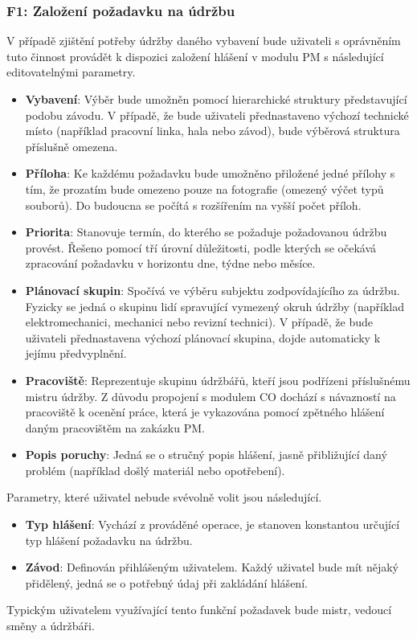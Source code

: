 \documentclass[thesis=M,czech]{FITthesis}[2012/06/26]
\begin{document}
\subsubsection{F1: Založení požadavku na údržbu}
V případě zjištění potřeby údržby daného vybavení bude uživateli s oprávněním tuto činnost provádět k dispozici založení hlášení v modulu PM s následující editovatelnými parametry.
\begin{itemize}
	\item
	\textbf{Vybavení}: Výběr bude umožněn pomocí hierarchické struktury představující podobu závodu. V případě, že bude uživateli přednastaveno výchozí technické místo (například pracovní linka, hala nebo závod), bude výběrová struktura příslušně omezena.  
	\item
	\textbf{Příloha}: Ke každému požadavku bude umožněno přiložené jedné přílohy s tím, že prozatím bude omezeno pouze na fotografie (omezený výčet typů souborů). Do budoucna se počítá s rozšířením na vyšší počet příloh.  
	\item
	\textbf{Priorita}: Stanovuje termín, do kterého se požaduje požadovanou údržbu provést. Řešeno pomocí tří úrovní důležitosti, podle kterých se očekává zpracování požadavku v horizontu dne, týdne nebo měsíce.
	\item
	\textbf{Plánovací skupin}: Spočívá ve výběru subjektu zodpovídajícího za údržbu. Fyzicky se jedná o skupinu lidí spravující vymezený okruh údržby (například elektromechanici, mechanici nebo revizní technici). V případě, že bude uživateli přednastavena výchozí plánovací skupina, dojde automaticky k jejímu předvyplnění.
	\item
	\textbf{Pracoviště}: Reprezentuje skupinu údržbářů, kteří jsou podřízeni příslušnému mistru údržby. Z důvodu propojení s modulem CO dochází s návazností na pracoviště k ocenění práce, která je vykazována pomocí zpětného hlášení daným pracovištěm na zakázku PM. 
	\item
	\textbf{Popis poruchy}: Jedná se o stručný popis hlášení, jasně přibližující daný problém (například došlý materiál nebo opotřebení). 
\end{itemize} 
Parametry, které uživatel nebude svévolně volit jsou následující.
\begin{itemize}
	\item
	\textbf{Typ hlášení}: Vychází z prováděné operace, je stanoven konstantou určující typ hlášení požadavku na údržbu.
	\item
	\textbf{Závod}: Definován přihlášeným uživatelem. Každý uživatel bude mít nějaký přidělený, jedná se o potřebný údaj při zakládání hlášení.
\end{itemize} 
Typickým uživatelem využívající tento funkční požadavek bude mistr, vedoucí směny a údržbáři.
\end{document}
